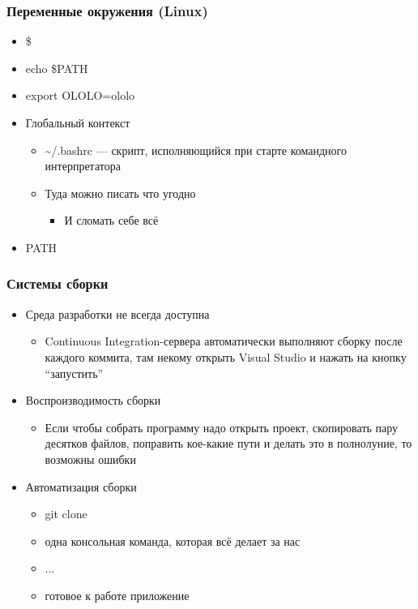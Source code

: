 \documentclass[xetex,mathserif,serif]{beamer}
\begin{document}
	\begin{frame}
		\frametitle{Переменные окружения (Linux)}
		\begin{itemize}
			\item \$<имя переменной>
			\item echo \$PATH
			\item export OLOLO=ololo
			\item Глобальный контекст
			\begin{itemize}
				\item \textasciitilde/.bashrc --- скрипт, исполняющийся при старте командного интерпретатора
				\item Туда можно писать что угодно
				\begin{itemize}
					\item И сломать себе всё
				\end{itemize}
			\end{itemize}
			\item PATH
		\end{itemize}
	\end{frame}

	\begin{frame}
		\frametitle{Системы сборки}
		\begin{itemize}
			\item Среда разработки не всегда доступна
			\begin{itemize}
				\item Continuous Integration-сервера автоматически выполняют сборку после каждого коммита, там некому открыть Visual Studio и нажать на кнопку ``запустить''
			\end{itemize}
			\item Воспроизводимость сборки
			\begin{itemize}
				\item Если чтобы собрать программу надо открыть проект, скопировать пару десятков файлов, поправить кое-какие пути и делать это в полнолуние, то возможны ошибки
			\end{itemize}
			\item Автоматизация сборки
			\begin{itemize}
				\item git clone
				\item одна консольная команда, которая всё делает за нас
				\item ...
				\item готовое к работе приложение
			\end{itemize}
		\end{itemize}
	\end{frame}
\end{document}
